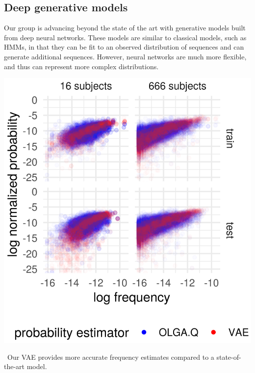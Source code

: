 \documentclass[nobib]{tufte-handout}
\begin{document}


\subsection*{Deep generative models}
Our group is advancing beyond the state of the art with generative models built from deep neural networks.
These models are similar to classical models, such as HMMs, in that they can be fit to an observed distribution of sequences and can generate additional sequences.
However, neural networks are much more flexible, and thus can represent more complex distributions.

\begin{marginfigure}[0.2in]%
\begin{centering}
    \includegraphics[width=\textwidth]{log_normed_Ppost_vs_log_normed_Pvae.png}
\end{centering}
  \caption{\
    Our VAE provides more accurate frequency estimates compared to a state-of-the-art model.
    }
  \label{FIGfrequency}
\end{marginfigure}%
\end{document}
